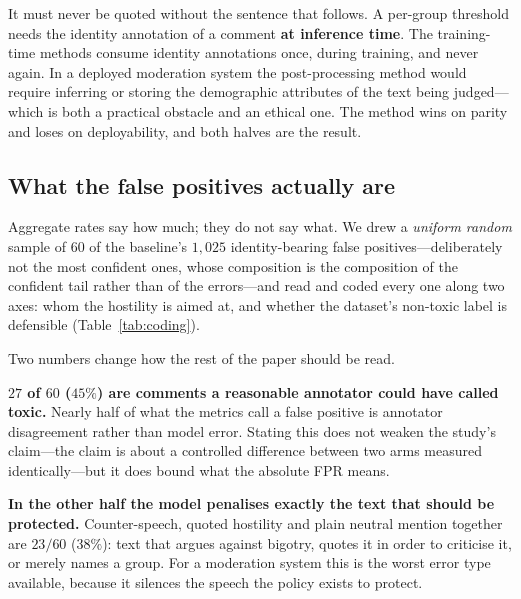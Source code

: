 \documentclass[conference]{IEEEtran}
\begin{document}
It must never be quoted without the sentence that follows. A per-group threshold
needs the identity annotation of a comment \textbf{at inference time}. The
training-time methods consume identity annotations once, during training, and
never again. In a deployed moderation system the post-processing method would
require inferring or storing the demographic attributes of the text being
judged---which is both a practical obstacle and an ethical one. The method wins
on parity and loses on deployability, and both halves are the result.

\subsection{What the false positives actually are}
\label{sec:coding}
Aggregate rates say how much; they do not say what. We drew a \emph{uniform
random} sample of $60$ of the baseline's $1{,}025$ identity-bearing false
positives---deliberately not the most confident ones, whose composition is the
composition of the confident tail rather than of the errors---and read and coded
every one along two axes: whom the hostility is aimed at, and whether the
dataset's non-toxic label is defensible (Table~\ref{tab:coding}).

\begin{table}[t]
\caption{Manual coding of a uniform random sample of $60$ identity-bearing false
positives from the baseline model. ``Label arguable'' counts comments a
reasonable annotator could have called toxic.}
\label{tab:coding}
\centering
\small

\end{table}

Two numbers change how the rest of the paper should be read.

\textbf{$27$ of $60$ ($45\%$) are comments a reasonable annotator could have
called toxic.} Nearly half of what the metrics call a false positive is annotator
disagreement rather than model error. Stating this does not weaken the study's
claim---the claim is about a controlled difference between two arms measured
identically---but it does bound what the absolute FPR means.

\textbf{In the other half the model penalises exactly the text that should be
protected.} Counter-speech, quoted hostility and plain neutral mention together
are $23/60$ ($38\%$): text that argues against bigotry, quotes it in order to
criticise it, or merely names a group. For a moderation system this is the worst
error type available, because it silences the speech the policy exists to
protect.
\end{document}
